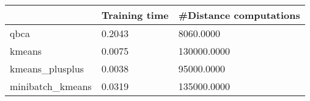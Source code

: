 \begin{table}[htbp]
\centering
\begin{tabular}{lll}
\toprule
 & Training time & #Distance computations \\
\midrule
qbca & 0.2043 & 8060.0000 \\
kmeans & 0.0075 & 130000.0000 \\
kmeans_plusplus & 0.0038 & 95000.0000 \\
minibatch_kmeans & 0.0319 & 135000.0000 \\
\bottomrule
\end{tabular}
\end{table}
